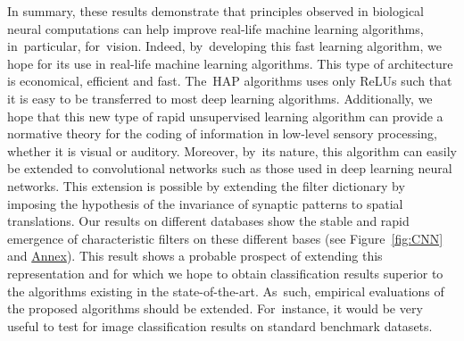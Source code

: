 \documentclass[vision,article,accept,oneauthor,pdftex]{Definitions/mdpi}
\newcommand{\seeFig}[1]{Figure~\ref{fig:#1}}%
\begin{document}
In summary, these results demonstrate that principles observed in biological neural computations can help improve real-life machine learning algorithms, in~particular, for~vision. Indeed, by~developing this fast learning algorithm, we hope for its use in real-life machine learning algorithms. This type of architecture is economical, efficient and fast. The~HAP algorithms uses only ReLUs such that it is easy to be transferred to most deep learning algorithms. %
Additionally, we hope that this new type of rapid unsupervised learning algorithm can provide a normative theory for the coding of information in low-level sensory processing, whether it is visual or auditory. Moreover, by~its nature, this algorithm can easily be extended to convolutional networks such as those used in deep learning neural networks. This extension is possible by extending the filter dictionary by imposing the hypothesis of the invariance of synaptic patterns to spatial translations. Our results on different databases show the stable and rapid emergence of characteristic filters on these different bases (see \seeFig{CNN} and \href{https://spikeai.github.io/HULK/#Testing-different-algorithms}{Annex}). This result shows a probable prospect of extending this representation and for which we hope to obtain classification results superior to the algorithms existing in the state-of-the-art. As~such, empirical evaluations of the proposed algorithms should be extended. For~instance, it would be very useful to test for image classification results on standard benchmark datasets.
\end{document}
